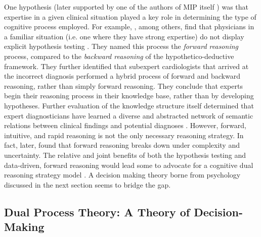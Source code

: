 One hypothesis (later supported by one of the authors of MIP itself \citep{elsteinThinkingDiagnosticThinking2009}) was that expertise in a given clinical situation played a key role in determining the type of cognitive process employed. For example, \citep{groenMedicalProblemsolvingQuestionable1985}, among others, find that physicians in a familiar situation (i.e. one where they have strong expertise) do not display explicit hypothesis testing \citep{schmidtCognitivePerspectiveMedical1990, brooksRoleSpecificSimilarity1991, evaExploringEtiologyContent1998}. They named this process the \emph{forward reasoning} process, compared to the \emph{backward reasoning} of the hypothetico-deductive framework. They further identified that subexpert cardiologists that arrived at the incorrect diagnosis performed a hybrid process of forward and backward reasoning, rather than simply forward reasoning. They conclude that experts begin their reasoning process in their knowledge base, rather than by developing hypotheses. Further evaluation of the knowledge structure itself determined that expert diagnosticians have learned a diverse and abstracted network of semantic relations between clinical findings and potential diagnoses \citep{bordageSemanticStructuresDiagnostic1991, patelKnowledgeBasedSolution1986}. However, forward, intuitive, and rapid reasoning is not the only necessary reasoning strategy. In fact, later, \citet{patelMedicalExpertiseFunction1990} found that forward reasoning breaks down under complexity and uncertainty. The relative and joint benefits of both the  hypothesis testing and data-driven, forward reasoning would lead some to advocate for a cognitive dual reasoning strategy model \citep{evaHeuristicsBiasesBiased2005}. A decision making theory borne from psychology discussed in the next section seems to bridge the gap.  

\subsection{Dual Process Theory: A Theory of Decision-Making}

